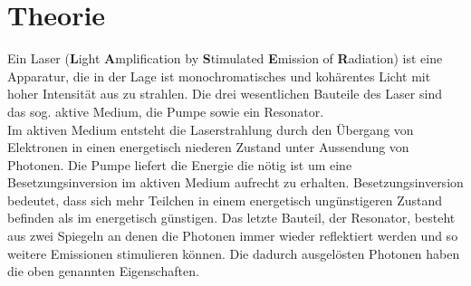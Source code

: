 
\section{Theorie}
\label{sec:Theorie}
Ein Laser (\textbf{L}ight \textbf{A}mplification by \textbf{S}timulated \textbf{E}mission of \textbf{R}adiation) ist eine Apparatur, die in der Lage ist
monochromatisches und kohärentes Licht mit hoher Intensität aus zu strahlen. Die drei wesentlichen Bauteile des Laser sind das sog. aktive Medium, die Pumpe sowie ein Resonator. \\
Im aktiven Medium entsteht die Laserstrahlung durch den Übergang von Elektronen in einen energetisch niederen Zustand unter Aussendung von Photonen.
Die Pumpe liefert die Energie die nötig ist um eine Besetzungsinversion im aktiven Medium aufrecht zu erhalten. Besetzungsinversion bedeutet, dass sich mehr Teilchen in einem
energetisch ungünstigeren Zustand befinden als im energetisch günstigen.
Das letzte Bauteil, der Resonator, besteht aus zwei Spiegeln an denen die Photonen immer wieder reflektiert werden und so weitere Emissionen stimulieren können.
Die dadurch ausgelösten Photonen haben die oben genannten Eigenschaften.
